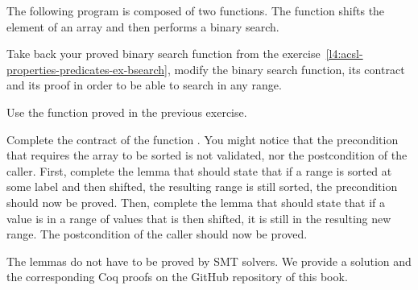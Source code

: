 

The following program is composed of two functions. The function
 shifts the element of an array and then
performs a binary search.




Take back your proved binary search function from the
exercise~\ref{l4:acsl-properties-predicates-ex-bsearch}, modify the binary
search function, its contract and its proof in order to be able to search in
any range.


Use the  function proved in the previous exercise.


Complete the contract of the function . You might
notice that the precondition that requires the array to be sorted is not
validated, nor the postcondition of the caller. First, complete the lemma
 that should state that if a range is sorted
at some label and then shifted, the resulting range is still sorted, the
precondition should now be proved. Then, complete the lemma
 that should state that if a value is in a range
of values that is then shifted, it is still in the resulting new range. The
postcondition of the caller should now be proved.


The lemmas do not have to be proved by SMT solvers. We provide a solution and
the corresponding Coq proofs on the GitHub repository of this book.
